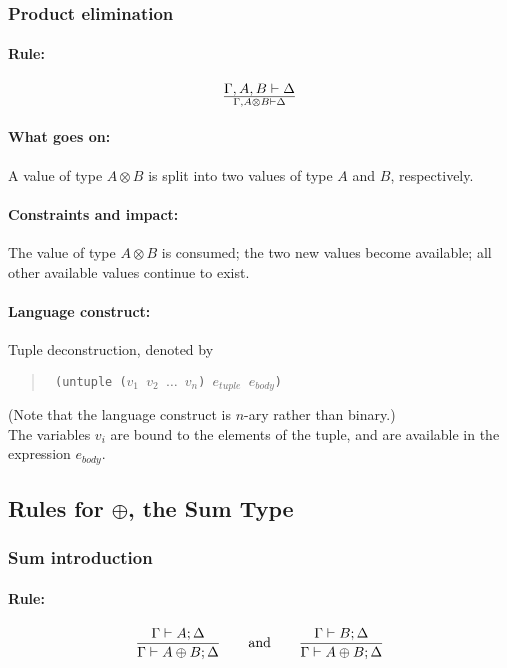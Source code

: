 \documentclass[a4paper]{article}
\begin{document}
\subsubsection{Product elimination}
\paragraph{Rule:}
$$
{
  \Gamma, A, B \vdash \Delta
}\over{
  \Gamma, A\otimes B \vdash \Delta
}
$$

\paragraph{What goes on:} A value of type $A \otimes B$ is split into two values of type $A$ and $B$, respectively.
\paragraph{Constraints and impact:} The value of type $A \otimes B$ is consumed; the two new values become available; all other available values continue to exist.
\paragraph{Language construct:} Tuple deconstruction, denoted by
\begin{quote}\tt
  (untuple ($v_1$ $v_2$ $\ldots$ $v_n$) $e_{tuple}$ $e_{body}$)
\end{quote}
(Note that the language construct is $n$-ary rather than binary.)\\
The variables $v_i$ are bound to the elements of the tuple, and are available in the expression $e_{body}$.



\subsection{Rules for $\oplus$, the Sum Type}


\subsubsection{Sum introduction}
\paragraph{Rule:}
$$
{{
  \Gamma \vdash A;\Delta
}\over{
  \Gamma \vdash A \oplus B;\Delta
}}
\qquad \textrm{and} \qquad
{{
  \Gamma \vdash B;\Delta
}\over{
  \Gamma \vdash A \oplus B;\Delta
}}
$$
\end{document}
